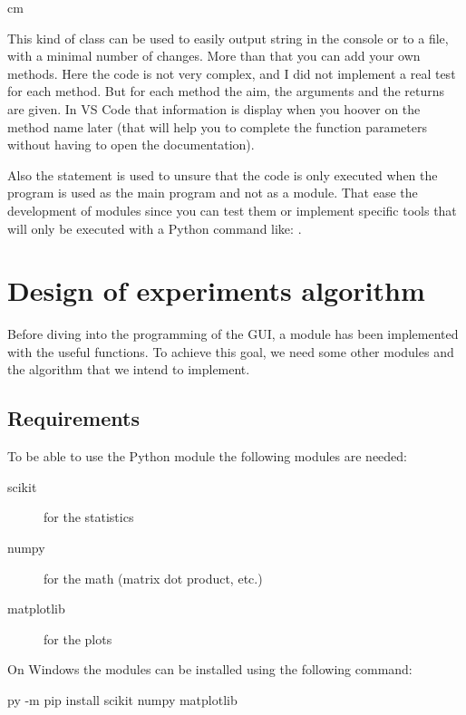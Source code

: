 \documentclass[english, 12 pt, openany, oneside]{book}
\begin{document}
 cm

This kind of class can be used to easily output string in the console or to a file, with a minimal number of changes. More than that you can add your own methods. Here the code is not very complex, and I did not implement a real test for each method. But for each method the aim, the arguments and the returns are given. In VS Code that information is display when you hoover on the method name later (that will help you to complete the function parameters without having to open the documentation).

Also the statement  is used to unsure that the code is only executed when the program is used as the main program and not as a module. That ease the development of modules since you can test them or implement specific tools that will only be executed with a Python command like: .
%


\section{Design of experiments algorithm}
Before diving into the programming of the GUI, a module has been implemented with the useful functions. To achieve this goal, we need some other modules and the algorithm that we intend to implement.


\subsection{Requirements}
To be able to use the Python module the following modules are needed:

\begin{description}
\item[scikit] for the statistics
\item[numpy] for the math (matrix dot product, etc.)
\item[matplotlib] for the plots
\end{description}

On Windows the modules can be installed using the following command:
\begin{pyverbatim}
py -m pip install scikit numpy matplotlib
\end{pyverbatim}
\end{document}

